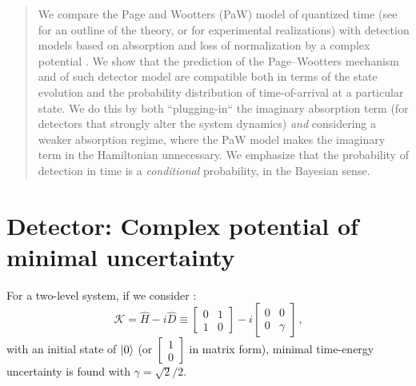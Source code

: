 \documentclass[landscape]{a0poster}
\DeclareMathOperator*{\repr}{\equiv}      %
\begin{document}
\begin{multicols}{3}
%
%
\color{Navy} %
%
\begin{abstract}%
\noindent %
We compare the Page and Wootters (PaW) model of quantized time
(see \cite{PageWootters, Lloyd:Time} for an outline of the theory,
or \cite{Moreva:illustration, Moreva_position} for experimental realizations)
with detection models based on absorption and loss of normalization
by a complex potential \cite{RuschhauptAbsorption}. We show that the prediction
of the Page--Wootters mechanism and of such detector model are compatible both in terms
of the state evolution and
the probability distribution of
time-of-arrival at a particular state.
We do this by both ``plugging-in``
the imaginary absorption term (for detectors that strongly alter the system dynamics)
\emph{and} considering a weaker absorption regime, where the PaW model makes
the imaginary term in the Hamiltonian unnecessary. We emphasize that the probability
of detection in time is a \emph{conditional}
probability, in the Bayesian \cite{Maccone:QMOT} sense.
\end{abstract}

\setlength{\parindent}{1.5em} %


\color{DarkSlateGray} %

\normalsize

\section*{Detector: Complex potential of minimal uncertainty}

For a two-level system, if we consider \cite{RuschhauptAbsorption}:
\begin{equation}\label{eq:complexpot}
  \mathcal{K} = \hat{H} - i\hat{D} \repr
    \left[\begin{matrix}0 & 1\\1 & 0\end{matrix}\right] -
    i \left[\begin{matrix}0 & 0\\0 & \gamma \end{matrix}\right]
    \,\text{,}
\end{equation}
with an initial state of $\ket{0}$
(or $\left[\begin{matrix}1\\0\end{matrix}\right]$ in matrix form),
minimal time-energy uncertainty is found with $\gamma = \sqrt{2}/2$.


\end{multicols}
\end{document}
